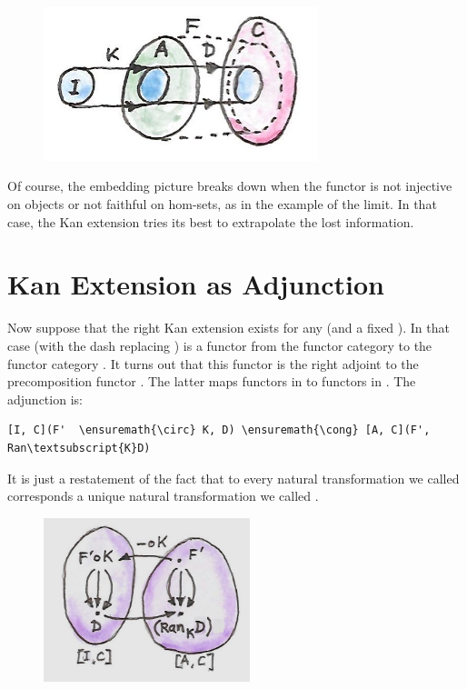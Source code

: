 \begin{figure}[H]
\centering
\includegraphics[width=80mm]{images/kan6.jpg}
\end{figure}

\noindent
Of course, the embedding picture breaks down when the functor 
is not injective on objects or not faithful on hom-sets, as in the
example of the limit. In that case, the Kan extension tries its best to
extrapolate the lost information.

\section{Kan Extension as
Adjunction}\label{kan-extension-as-adjunction}

Now suppose that the right Kan extension exists for any  (and
a fixed ). In that case  (with the dash
replacing ) is a functor from the functor category
\code{{[}I, C{]}} to the functor category \code{{[}A, C{]}}. It
turns out that this functor is the right adjoint to the precomposition
functor . The latter maps functors in \code{{[}A, C{]}}
to functors in \code{{[}I, C{]}}. The adjunction is:

\begin{Verbatim}[commandchars=\\\{\}]
[I, C](F'  \ensuremath{\circ} K, D) \ensuremath{\cong} [A, C](F', Ran\textsubscript{K}D)
\end{Verbatim}
It is just a restatement of the fact that to every natural
transformation we called  corresponds a unique natural
transformation we called .

\begin{figure}[H]
\centering
\includegraphics[width=60mm]{images/kan92.jpg}
\end{figure}

